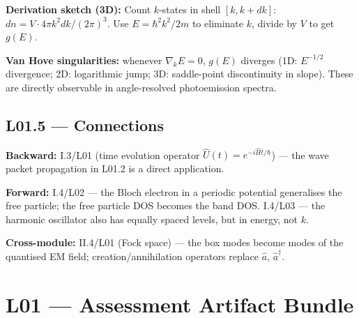 \textbf{Derivation sketch (3D):}
Count $k$-states in shell $[k, k+dk]$: $dn = V\cdot 4\pi k^2 dk/(2\pi)^3$.
Use $E = \hbar^2k^2/2m$ to eliminate $k$, divide by $V$ to get $g(E)$.

\quad
\textbf{Van Hove singularities:} whenever $\nabla_k E = 0$, $g(E)$ diverges
(1D: $E^{-1/2}$ divergence; 2D: logarithmic jump; 3D: saddle-point discontinuity in slope).
These are directly observable in angle-resolved photoemission spectra.

\subsection*{L01.5 — Connections}
\label{sec:L01.5}

\textbf{Backward:} I.3/L01 (time evolution operator $\hat{U}(t) = e^{-i\hat{H}t/\hbar}$) —
the wave packet propagation in L01.2 is a direct application.

\textbf{Forward:} I.4/L02 — the Bloch electron in a periodic potential generalises
the free particle; the free particle DOS becomes the band DOS.
I.4/L03 — the harmonic oscillator also has equally spaced levels, but in energy, not $k$.

\textbf{Cross-module:} II.4/L01 (Fock space) — the box modes become modes of the
quantised EM field; creation/annihilation operators replace $\hat{a}$, $\hat{a}^\dagger$.

\newpage
\section*{L01 — Assessment Artifact Bundle}

